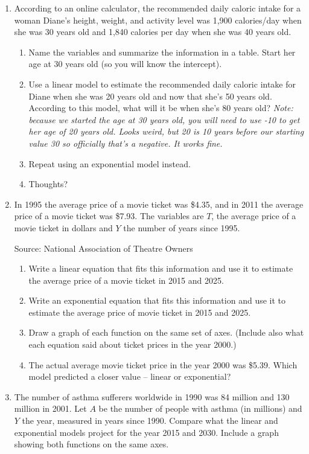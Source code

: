 \begin{enumerate}
\item According to an online calculator, the recommended daily caloric intake for a woman Diane's height, weight, and activity level was 1,900 calories/day when she was 30 years old and 1,840 calories per day when she was 40 years old.
\begin{enumerate}
\item Name the variables and summarize the information in a table.  Start her age at 30 years old (so you will know the intercept).
\item Use a linear model to estimate the recommended daily caloric intake for Diane when she was 20 years old and now that she's 50 years old.  According to this model, what will it be when she's 80 years old? \emph{Note:  because we started the age at 30 years old, you will need to use -10 to get her age of 20 years old.  Looks weird, but 20 is 10 years before our starting value 30 so officially that's a negative.  It works fine.}
\item Repeat using an exponential model instead.
\item Thoughts?
\end{enumerate}

\item In 1995 the average price of a movie ticket was \$4.35, and in 2011 the average price of a movie ticket was \$7.93.  The variables are $T$, the average price of a movie ticket in dollars and $Y$ the number of years since 1995.  

\hfill \begin{footnotesize} Source: National Association of Theatre Owners \end{footnotesize}
\begin{enumerate}
\item Write a linear equation that fits this information and use it to estimate the average price of a movie ticket in 2015 and 2025.
\item Write an exponential equation that fits this information and use it to estimate the average price of movie ticket in 2015 and 2025.
\item Draw a graph of each function on the same set of axes.  (Include also what each equation said about ticket prices in the year 2000.)
\item The actual average movie ticket price in the year 2000 was \$5.39.  Which model predicted a closer value -- linear or exponential?
\end{enumerate}

\item The number of asthma sufferers worldwide in 1990 was 84 million and 130 million in 2001.  Let $A$ be the number of people with asthma (in millions) and $Y$ the year, measured in years since 1990.  Compare what the linear and exponential models project for the year 2015 and 2030.  Include a graph showing both functions on the same axes.


\end{enumerate}
